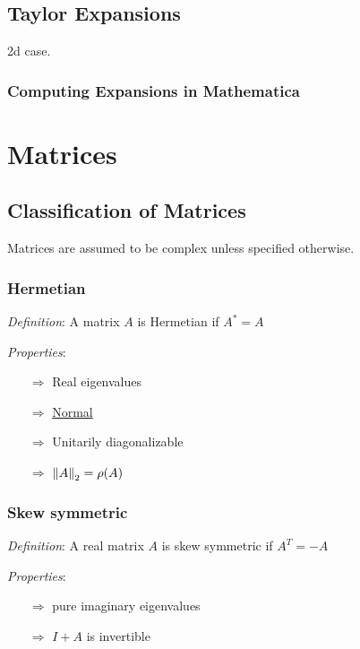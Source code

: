 \documentclass[12pt]{article}
\begin{document}
\subsection{Taylor Expansions}

2d case.

\subsubsection{Computing Expansions in Mathematica}



\pagebreak
\section{Matrices}

\subsection{Classification of Matrices}
Matrices are assumed to be complex unless specified otherwise.

\subsubsection{Hermetian}
\textit{Definition}: A matrix \( A \) is Hermetian if \( A^* = A \)

\textit{Properties}:
\begin{itemize}[nolistsep]
    \item[\(\Rightarrow\)] Real eigenvalues
    \item[\(\Rightarrow\)] \hyperref[sec:normal]{Normal}
    \item[\(\Rightarrow\)] Unitarily diagonalizable
    \item[\(\Rightarrow\)] \( \left\lVert A\right\rVert_2 = \rho(A) \)
\end{itemize}


\subsubsection{Skew symmetric}
\textit{Definition}: A real matrix \( A \) is skew symmetric if \( A^T = -A \)

\textit{Properties}:
\begin{itemize}[nolistsep]
    \item[\(\Rightarrow\)] pure imaginary eigenvalues
    \item[\(\Rightarrow\)] \( I+A \) is invertible
\end{itemize}
\end{document}
